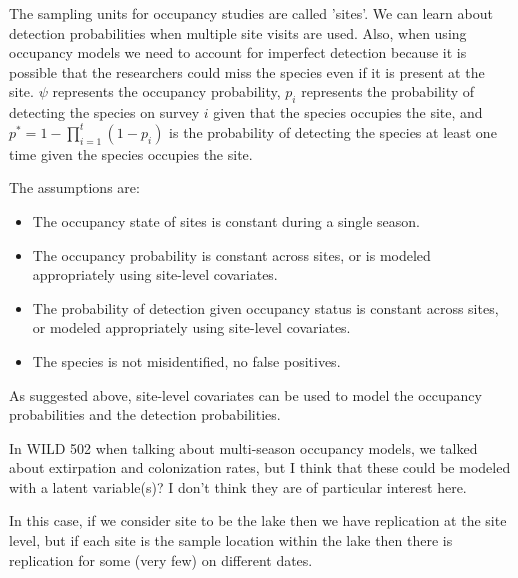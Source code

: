 \documentclass[12pt]{article}\usepackage[]{graphicx}\usepackage[]{color}
\begin{document}
The sampling units for occupancy studies are called 'sites'. We can learn about detection probabilities when multiple site visits are used. Also, when using occupancy models we need to account for imperfect detection because it is possible that the researchers could miss the species even if it is present at the site. $\psi$ represents the occupancy probability, $p_i$ represents the probability of detecting the species on survey $i$ given that the species occupies the site, and $p^* = 1- \prod_{i = 1}^{t} (1-p_i)$ is the probability of detecting the species at least one time given the species occupies the site. 

The assumptions are: 
\begin{itemize}
\item The occupancy state of sites is constant during a single season. 
\item The occupancy probability is constant across sites, or is modeled appropriately using site-level covariates. 
\item The probability of detection given occupancy status is constant across sites, or modeled appropriately using site-level covariates. 
\item The species is not misidentified, no false positives. 
\end{itemize}

As suggested above, site-level covariates can be used to model the occupancy probabilities and the detection probabilities. 

In WILD 502 when talking about multi-season occupancy models, we talked about extirpation and colonization rates, but I think that these could be modeled with a latent variable(s)? I don't think they are of particular interest here. 

In this case, if we consider site to be the lake then we have replication at the site level, but if each site is the sample location within the lake then there is replication for some (very few) on different dates. 

\end{document}

